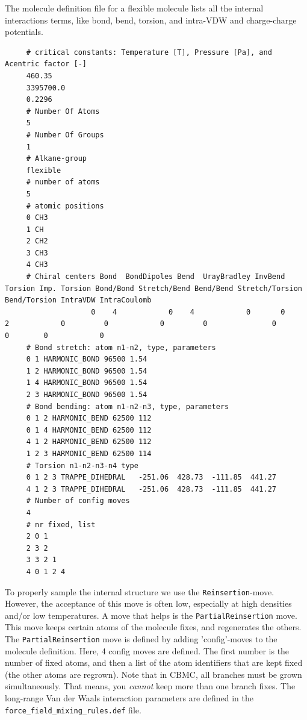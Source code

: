 \noindent
The molecule definition file for a flexible molecule lists all the internal interactions terms, like bond, bend, torsion,
and intra-VDW and charge-charge potentials.
\begin{tiny}
\begin{verbatim}
     # critical constants: Temperature [T], Pressure [Pa], and Acentric factor [-]
     460.35
     3395700.0
     0.2296
     # Number Of Atoms
     5
     # Number Of Groups
     1
     # Alkane-group
     flexible
     # number of atoms
     5
     # atomic positions
     0 CH3
     1 CH
     2 CH2
     3 CH3
     4 CH3
     # Chiral centers Bond  BondDipoles Bend  UrayBradley InvBend  Torsion Imp. Torsion Bond/Bond Stretch/Bend Bend/Bend Stretch/Torsion Bend/Torsion IntraVDW IntraCoulomb
                    0    4            0    4            0       0        2            0         0            0         0               0            0        0            0
     # Bond stretch: atom n1-n2, type, parameters
     0 1 HARMONIC_BOND 96500 1.54
     1 2 HARMONIC_BOND 96500 1.54
     1 4 HARMONIC_BOND 96500 1.54
     2 3 HARMONIC_BOND 96500 1.54
     # Bond bending: atom n1-n2-n3, type, parameters
     0 1 2 HARMONIC_BEND 62500 112
     0 1 4 HARMONIC_BEND 62500 112
     4 1 2 HARMONIC_BEND 62500 112
     1 2 3 HARMONIC_BEND 62500 114
     # Torsion n1-n2-n3-n4 type
     0 1 2 3 TRAPPE_DIHEDRAL   -251.06  428.73  -111.85  441.27
     4 1 2 3 TRAPPE_DIHEDRAL   -251.06  428.73  -111.85  441.27
     # Number of config moves
     4
     # nr fixed, list
     2 0 1
     2 3 2
     3 3 2 1
     4 0 1 2 4
\end{verbatim}
\end{tiny}
To properly sample the internal structure we use the \verb+Reinsertion+-move.
However, the acceptance of this move is often low, especially at high densities and/or low temperatures.
A move that helps is the \verb+PartialReinsertion+ move. This move keeps certain atoms of the molecule fixes, and 
regenerates the others. The \verb+PartialReinsertion+ move is defined by adding 'config'-moves to the molecule definition.
Here, 4 config moves are defined. The first number is the number of fixed atoms, and then a list of the atom identifiers that are kept fixed
(the other atoms are regrown). Note that in CBMC, all branches must be grown simultaneously. That means, you \emph{cannot} keep more than one branch fixes.
The long-range Van der Waals interaction parameters are defined in the \verb+force_field_mixing_rules.def+ file.
